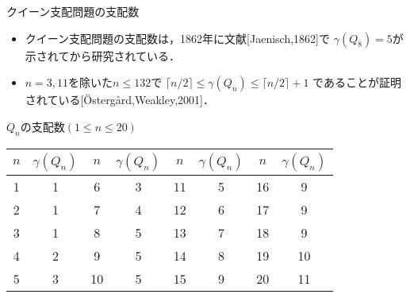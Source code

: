 \documentclass[dvipdfmx,10pt]{beamer}
\begin{document}
\begin{frame}{クイーン支配問題の支配数}
  \begin{itemize}
    \item クイーン支配問題の支配数は，1862年に文献[Jaenisch,1862]で
	    $\gamma(Q_8)=5$が示されてから研究されている．
    \item $n=3,11$を除いた$n \leq 132$で $\lceil n/2 \rceil 
	    \leq \gamma(Q_{n}) \leq \lceil n/2 \rceil +1$
	 であることが証明されている[\"{O}sterg{\aa}rd,Weakley,2001]．
  \end{itemize}
 \begin{exampleblock}{$Q_{n}$の支配数$(1 \leq n \leq 20)$}
  \centering

  \begin{tabular}{c|c||c|c||c|c||c|c}%
    $n$ & $\gamma(Q_{n})$ & $n$ & $\gamma(Q_{n})$ &$n$ & $\gamma(Q_{n})$ &$n$ & $\gamma(Q_{n})$ \\ \hline
    1 &1 &6 &3 &11 &5 &16 &9 \\ %
    2 &1 &7 &4 &12 &6 &17 &9 \\ %
    3 &1 &8 &5 &13 &7 &18 &9 \\ %
    4 &2 &9 &5 &14 &8 &19 &10 \\ %
    5 &3 &10 &5 &15 &9 &20 &11 \\ %
  \end{tabular}
 \end{exampleblock}
\end{frame}

%
%
\end{document}
